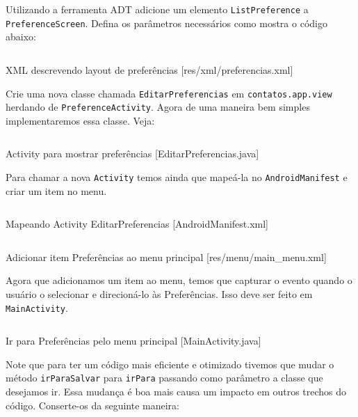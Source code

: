 Utilizando a ferramenta ADT adicione um elemento \texttt{ListPreference}
a \texttt{PreferenceScreen}. Defina os parâmetros necessários como
mostra o código abaixo:

\begin{listing}[H]
  \inputminted[linenos=true,frame=bottomline,tabsize=3]{ xml }{ source/preferencias-1.xml }
  \caption{XML descrevendo layout de preferências [res/xml/preferencias.xml]}
\end{listing}

Crie uma nova classe chamada \texttt{EditarPreferencias} em
\texttt{contatos.app.view} herdando de \texttt{PreferenceActivity}.
Agora de uma maneira bem simples implementaremos essa classe. Veja:

\begin{listing}[H]
  \inputminted[linenos=true,frame=bottomline,tabsize=3]{ java }{ source/EditarPreferencias-1.java }
  \caption{Activity para mostrar preferências [EditarPreferencias.java]}
\end{listing}

Para chamar a nova \texttt{Activity} temos ainda que mapeá-la no
\texttt{AndroidManifest} e criar um item no menu.

\begin{listing}[H]
  \inputminted[linenos=true,frame=bottomline,tabsize=3]{ xml }{ source/AndroidManifest-4.xml }
  \caption{Mapeando Activity EditarPreferencias [AndroidManifest.xml]}
\end{listing}

\begin{listing}[H]
  \inputminted[linenos=true,frame=bottomline,tabsize=3]{ xml }{ source/main_menu-2.xml }
  \caption{Adicionar item Preferências ao menu principal [res/menu/main_menu.xml]}
\end{listing}

Agora que adicionamos um item ao menu, temos que capturar o evento
quando o usuário o selecionar e direcioná-lo às Preferências. Isso deve
ser feito em \texttt{MainActivity}.

\begin{listing}[H]
  \inputminted[linenos=true,frame=bottomline,tabsize=3]{ java }{ source/MainActivity-12.java }
  \caption{Ir para Preferências pelo menu principal [MainActivity.java]}
\end{listing}

Note que para ter um código mais eficiente e otimizado tivemos que mudar
o método \texttt{irParaSalvar} para \texttt{irPara} passando como
parâmetro a classe que desejamos ir. Essa mudança é boa mais causa um
impacto em outros trechos do código. Conserte-os da seguinte maneira:


